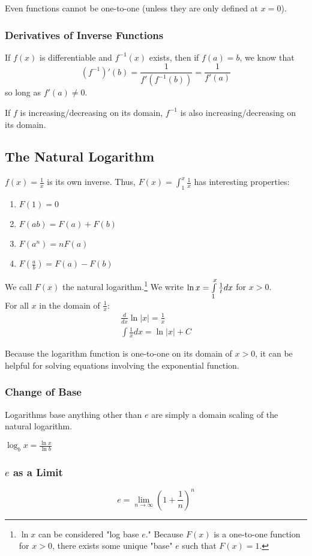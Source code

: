 \documentclass{article}
\begin{document}
Even functions cannot be one-to-one (unless they are only defined at $x=0$).

\subsubsection{Derivatives of Inverse Functions} \label{inverse-derivatives}
If $f(x)$ is differentiable and $f^{-1}(x)$ exists, then if $f(a)=b$, we know that
$$(f^{-1})'(b)=\frac{1}{f'(f^{-1}(b))}=\frac{1}{f'(a)}$$
so long as $f'(a)\ne0$.

If $f$ is increasing/decreasing on its domain, $f^{-1}$ is also increasing/decreasing on its domain.

\subsection{The Natural Logarithm}
$f(x)=\frac{1}{x}$ is its own inverse. Thus, $F(x)=\int_1^x\frac{1}{x}$ has interesting properties:
\begin{enumerate}
    \item $F(1)=0$
    \item $F(ab)=F(a)+F(b)$
    \item $F(a^n)=nF(a)$
    \item $F(\frac{a}{b})=F(a)-F(b)$
\end{enumerate}
We call $F(x)$ the natural logarithm.\footnote{$\ln{x}$ can be considered "log base $e$." Because $F(x)$ is a one-to-one function for $x>0$, there exists some unique "base" $e$ such that $F(x)=1$.} We write $\ln{x}=\int_1^x\limits\frac{1}{t}dx$ for $x>0$.\\
For all $x$ in the domain of $\frac{1}{x}$:
\begin{align*}
  \frac{d}{dx}\ln{|x|}=\frac{1}{x}\\
  \int\frac{1}{x}dx=\ln{|x|}+C
\end{align*}

Because the logarithm function is one-to-one on its domain of $x>0$, it can be helpful for solving equations involving the exponential function.

\subsubsection{Change of Base}
Logarithms base anything other than $e$ are simply a domain scaling of the natural logarithm.

$\log_bx=\frac{\ln{x}}{\ln{b}}$

\subsubsection{\texorpdfstring{$e$ as a Limit}{e as a Limit}}
$$e=\lim_{n\to\infty}\left(1+\frac{1}{n}\right)^n$$
\end{document}
